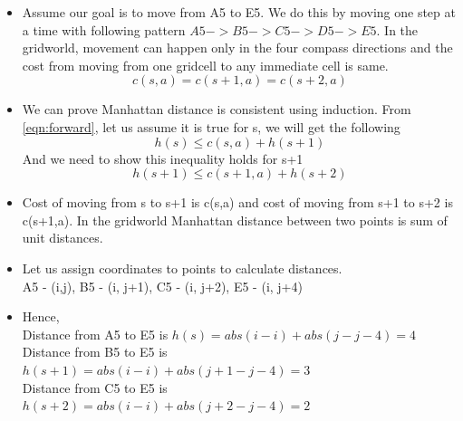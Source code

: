 \documentclass[a4 paper]{article}
\begin{document}
\begin{itemize}
    \item Assume our goal is to move from A5 to E5. We do this by moving one step at a time with following pattern $A5 -> B5 -> C5  -> D5  -> E5.$ In the gridworld, movement can happen only in the four compass directions and the cost from moving from one gridcell to any immediate cell is same.
    \begin{equation}
    c(s, a) = c(s+1, a) = c(s+2,a)
    \end{equation}
    
    \item We can prove Manhattan distance is consistent using induction. From \ref{eqn:forward}, let us assume it is true for s, we will get the following
    \begin{equation}
    h(s) \leq c(s, a) + h(s+1)
    \label{eqn:ind_assumption}
    \end{equation}
     And we need to show this inequality holds for s+1
    \begin{equation}
    h(s+1) \leq c(s+1, a) + h(s+2)
    \label{eqn:ind_prove}
    \end{equation}  
    
    \item Cost of moving from s to s+1 is c(s,a) and cost of moving from s+1 to s+2 is c(s+1,a). In the gridworld Manhattan distance between two points is sum of unit distances.
    \item Let us assign coordinates to points to calculate distances. \\
    A5 - (i,j), B5 - (i, j+1), C5 - (i, j+2), E5 - (i, j+4)
    
    
    \item Hence, \\
    Distance from A5 to E5 is $h(s) = abs(i-i)+abs(j-j-4) = 4$ \\
    Distance from B5 to E5 is $h(s+1) = abs(i-i)+abs(j+1-j-4) = 3$ \\
    Distance from C5 to E5 is $h(s+2) = abs(i-i)+abs(j+2-j-4) = 2$
    

\end{itemize}
\end{document}
